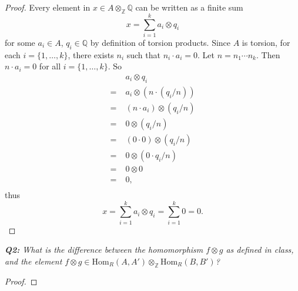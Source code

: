 \documentclass{article}
\begin{document}
\begin{enumerate}[label={(\alph*)}]
      \begin{proof}
        Every element in $x\in A\otimes_\mathbb{Z}\mathbb{Q}$ can be
        written as a finite sum
        \[x=\sum_{i=1}^k a_i\otimes q_i\]
        for some $a_i\in A$, $q_i\in \mathbb{Q}$ by definition of torsion
        products. Since $A$ is torsion, for each $i=\{1,\ldots,k\}$,
        there exists $n_i$ such that $n_i\cdot a_i=0$. Let $n=n_1\cdots
        n_k$. Then $n\cdot a_i=0$ for all $i=\{1,\ldots,k\}$. So
        \begin{align*}
          &\;a_i\otimes q_i\\
          =&\;a_i\otimes(n\cdot(q_i/n))\\
          =&\;(n\cdot a_i)\otimes(q_i/n)\\
          =&\;0\otimes(q_i/n)\\
          =&\;(0\cdot0)\otimes(q_i/n)\\
          =&\;0\otimes(0\cdot q_i/n)\\
          =&\;0\otimes0\\
          =&\;0,\\
        \end{align*}
        thus
        \[x=\sum_{i=1}^k a_i\otimes q_i =\sum_{i=1}^k 0=0.\]
      \end{proof}
  \end{enumerate}

\it \textbf{Q2:} What is the difference between the homomorphism $f\otimes
  g$ as defined in class, and the element $f\otimes g\in\text{Hom}_R(A,A')
  \otimes_\mathbb{Z}\text{Hom}_R(B,B')$?
  \begin{proof}
  \end{proof}
\end{document}
